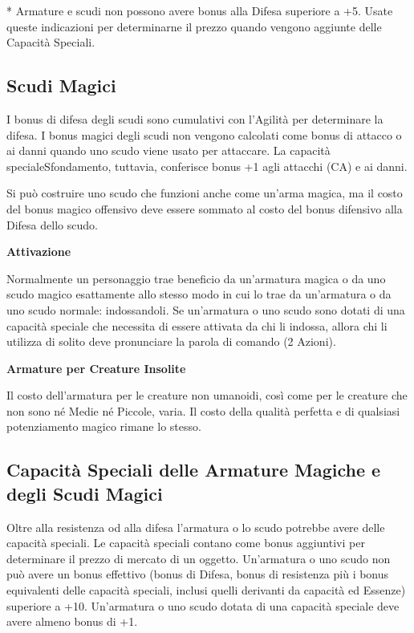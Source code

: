 \documentclass[a4paper,11pt,twoside,openany]{book}
\begin{document}
{\begin{tabular}{ll}
\end{tabular}

{*} Armature e scudi non possono avere bonus alla Difesa superiore
a +5. Usate queste indicazioni per determinarne il prezzo quando vengono
aggiunte delle Capacità Speciali.

\subsection{Scudi Magici}

\label{scudi-magici}

I bonus di difesa degli scudi sono cumulativi con l'Agilità per determinare la difesa. I bonus magici degli scudi non vengono calcolati come bonus di attacco o ai danni quando uno scudo viene usato per attaccare. La capacità specialeSfondamento, tuttavia, conferisce bonus +1 agli attacchi (CA) e ai danni.

Si può costruire uno scudo che funzioni anche come un'arma magica, ma il costo del bonus magico offensivo deve essere sommato al costo del bonus difensivo alla Difesa dello scudo.

\textbf{Attivazione}

Normalmente un personaggio trae beneficio da un'armatura magica o da uno scudo magico esattamente allo stesso modo in cui lo trae da un'armatura o da uno scudo normale: indossandoli. Se un'armatura o uno scudo sono dotati di una capacità speciale che necessita di essere attivata da chi li indossa, allora chi li utilizza di solito deve pronunciare la parola di comando (2 Azioni).

\textbf{Armature per Creature Insolite}

Il costo dell'armatura per le creature non umanoidi, così come per le creature che non sono né Medie né Piccole, varia. Il costo della qualità perfetta e di qualsiasi potenziamento magico rimane lo stesso.



\subsection{Capacità Speciali delle Armature Magiche e degli Scudi Magici}

\label{capacita-speciali-delle-armature-magiche-e-degli-scudi-magici}

Oltre alla resistenza od alla difesa l'armatura o lo scudo potrebbe avere delle capacità speciali. Le capacità speciali contano come bonus aggiuntivi per determinare il prezzo di mercato di un oggetto. Un'armatura o uno scudo non può avere un bonus effettivo (bonus di Difesa, bonus di resistenza più i bonus equivalenti delle capacità speciali, inclusi quelli derivanti da capacità ed Essenze) superiore a +10. Un'armatura o uno scudo dotata di una capacità speciale deve avere almeno bonus di +1.

}
\end{document}
